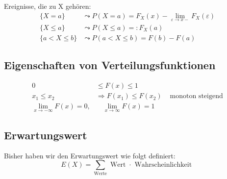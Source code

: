 \documentclass[10pt,a4paper]{scrartcl}
\newif\ifincludeExamples
\begin{document}
Ereignisse, die zu X gehören:
\begin{align*}
 \{X = a\} &  \leadsto P(X= a) = F_X(x) - \lim_{\varepsilon\to x-} F_X(\varepsilon) \\
 \{X\le a\} &  \leadsto P(X\le a) =: F_X(a) \\
 \{a < X \le b\} & \leadsto P(a < X \le b) = F(b) - F(a) 
\end{align*}

\ifincludeExamples
\paragraph{Beispiel} $X = $ ``Würfel''
$$ F_X(a) = \text{ Wahrscheinlichkeit, dass Augenzahl } \le a = P(x \le a) $$ %

Von der Verteilungsfunktion zur Wahrscheinlichkeit:
\begin{align*}
P(X=2) & = P(1.5 < X \le 2.5) = P(X\le2.5) - P(X\le1.5) = F(2.5) - F(1.5) \\
\text{besser } P(X=2) & = F(2) - \lim_{x\to2-} F(x)
\end{align*}

\paragraph{Beispiel: $\infty$ -Würfel}
Zylinder mit Endposition $X$ in $[0, 2\pi]$
\begin{align*}
P(a<X\le b) & = \frac{b-a}{2\pi} \\
F(a) = P(X\le a) & = P(0<X\le a) = \frac{a}{2\pi}
\end{align*}
\fi
\subsection{Eigenschaften von Verteilungsfunktionen}
\begin{align}
0 & \le F(x) \le 1 \\
x_1 \le x_2 & \Rightarrow F(x_1) \le F(x_2) & \text{ monoton steigend} \\
\lim_{x\to-\infty} F(x) = 0, & \quad\lim_{x\to\infty} F(x) = 1
\end{align}

\subsection{Erwartungswert}

Bisher haben wir den Erwartungswert wie folgt definiert:
$$
  E(X) = \sum_{\text{Werte}} \text{ Wert } \cdot \text{ Wahrscheinlichkeit }
$$
\end{document}
